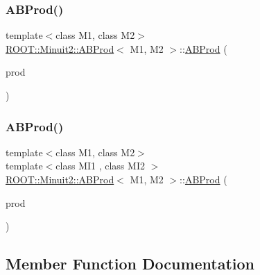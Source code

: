 \subsubsection{\texorpdfstring{ABProd()}{ABProd()}\hspace{0.1cm}{\footnotesize\ttfamily [5/6]}}
{\footnotesize\ttfamily template$<$class M1, class M2$>$ \\
\mbox{\hyperlink{classROOT_1_1Minuit2_1_1ABProd}{R\+O\+O\+T\+::\+Minuit2\+::\+A\+B\+Prod}}$<$ M1, M2 $>$\+::\mbox{\hyperlink{classROOT_1_1Minuit2_1_1ABProd}{A\+B\+Prod}} (\begin{DoxyParamCaption}\item[{const \mbox{\hyperlink{classROOT_1_1Minuit2_1_1ABProd}{A\+B\+Prod}}$<$ M1, M2 $>$ \&}]{prod }\end{DoxyParamCaption})\hspace{0.3cm}{\ttfamily [inline]}}

\mbox{\label{classROOT_1_1Minuit2_1_1ABProd_a792de1723360074762c646a30e7889f3}} 
\subsubsection{\texorpdfstring{ABProd()}{ABProd()}\hspace{0.1cm}{\footnotesize\ttfamily [6/6]}}
{\footnotesize\ttfamily template$<$class M1, class M2$>$ \\
template$<$class M\+I1 , class M\+I2 $>$ \\
\mbox{\hyperlink{classROOT_1_1Minuit2_1_1ABProd}{R\+O\+O\+T\+::\+Minuit2\+::\+A\+B\+Prod}}$<$ M1, M2 $>$\+::\mbox{\hyperlink{classROOT_1_1Minuit2_1_1ABProd}{A\+B\+Prod}} (\begin{DoxyParamCaption}\item[{const \mbox{\hyperlink{classROOT_1_1Minuit2_1_1ABProd}{A\+B\+Prod}}$<$ M\+I1, M\+I2 $>$ \&}]{prod }\end{DoxyParamCaption})\hspace{0.3cm}{\ttfamily [inline]}}



\subsection{Member Function Documentation}
\mbox{\label{classROOT_1_1Minuit2_1_1ABProd_a14f6ecd4f0a72010d6c2a8e7f2916cfa}} 
